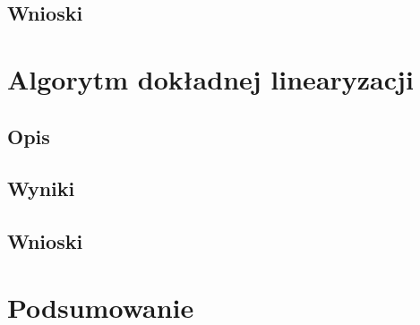 \documentclass[12pt,a4paper]{article}
\begin{document}
  \subsection{Wnioski}

\section{Algorytm dokładnej linearyzacji}
  \subsection{Opis} %
  \subsection{Wyniki} %
  \subsection{Wnioski}

\section{Podsumowanie}




  

\end{document}
